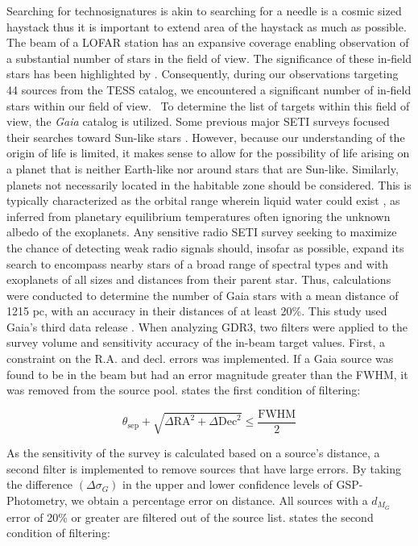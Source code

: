 Searching for technosignatures is akin to searching for a needle is a cosmic sized haystack thus it is important to extend area of the haystack as much as possible. The beam of a LOFAR station has an expansive coverage enabling observation of a substantial number of stars in the field of view. The significance of these in-field stars has been highlighted by \cite{Bart-Wlodarczyk-Sroka}. Consequently, during our observations targeting 44 sources from the TESS catalog, we encountered a significant number of in-field stars within our field of view. \ 
To determine the list of targets within this field of view, the \textit{Gaia} catalog is utilized. Some previous major SETI surveys focused their searches toward Sun-like stars \citep{Tarter:1996jf}. However, because our understanding of the origin of life is limited, it makes sense to allow for the possibility of life arising on a planet that is neither Earth-like nor around stars that are Sun-like. Similarly, planets not necessarily located in the habitable zone should be considered. This is typically characterized as the orbital range wherein liquid water could exist \citep{Kasting1993}, as inferred from planetary equilibrium temperatures often ignoring the unknown albedo of the exoplanets. Any sensitive radio SETI survey seeking to maximize the chance of detecting weak radio signals should, insofar as possible, expand its search to encompass nearby stars of a broad range of spectral types and with exoplanets of all sizes and distances from their parent star. Thus, calculations were conducted to determine the number of Gaia stars with a mean distance of 1215 pc, with an accuracy in their distances of at least 20\%. This study used Gaia's third data release \cite[GDR3;][]{GaiaDR3,astroquery}. When analyzing GDR3, two filters were applied to the survey volume and sensitivity accuracy of the in-beam target values. First, a constraint on the R.A. and decl. errors was implemented. If a Gaia source was found to be in the beam but had an error magnitude greater than the FWHM, it was removed from the source pool.  states the first condition of filtering:

\begin{equation}
    \theta_{\text{sep}} + \sqrt{\Delta \text{RA}^2 + \Delta \text{Dec}^2} \leq \frac{\text{FWHM}}{2}
    \label{Gaia:filter1}
\end{equation}

As the sensitivity of the survey is calculated based on a source's distance, a second filter is implemented to remove sources that have large errors. By taking the difference $(\Delta \sigma_G)$ in the upper and lower confidence levels of GSP-Photometry, we obtain a percentage error on distance. All sources with a $d_{M_G}$ error of 20\% or greater are filtered out of the source list.  states the second condition of filtering:

